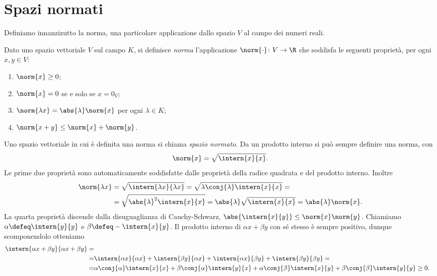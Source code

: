 \section{Spazi normati} \label{sec:spazi-normati}
Definiamo innanzizutto la norma, una particolare applicazione dallo spazio $V$ al campo dei numeri reali.
\begin{definizione} \label{d:norma}
	Dato uno spazio vettoriale $V$ sul campo $K$, si definisce \emph{norma} l'applicazione $\norm{\cdot}\colon V\to\R$ che soddisfa le seguenti proprietà, per ogni $  x,  y\in V$:
	\begin{enumerate}
		\item $\norm{  x}\geq 0$;
		\item $\norm{  x}=0$ se e solo se $  x=0_V$;
		\item $\norm{\lambda  x}=\abs{\lambda}\norm{  x}$ per ogni $\lambda\in K$;
		\item $\norm{  x+  y}\leq\norm{  x}+\norm{  y}$.
	\end{enumerate}
\end{definizione}
Uno spazio vettoriale in cui è definita una norma si chiama \emph{spazio normato}.
Da un prodotto interno si può sempre definire una norma, con
\begin{equation*}
	\norm{  x}=\sqrt{\intern{  x}{  x}}.
\end{equation*}
Le prime due proprietà sono automaticamente soddisfatte dalle proprietà della radice quadrata e del prodotto interno. Inoltre
\begin{equation*}
	\begin{split}
		\norm{\lambda  x}&=\sqrt{\intern{\lambda  x}{\lambda  x}}=\sqrt{\lambda\conj{\lambda}\intern{  x}{  x}}=\\
			 &=\sqrt{\abs{\lambda}^2\intern{  x}{  x}}=\abs{\lambda}\sqrt{\intern{  x}{  x}}=\abs{\lambda}\norm{  x}.
	\end{split}
\end{equation*}
La quarta proprietà discende dalla disuguaglianza di Cauchy-Schwarz, $\abs{\intern{  x}{  y}}\leq\norm{  x}\norm{  y}$.
Chiamiamo $\alpha\defeq\intern{  y}{  y}$ e $\beta\defeq-\intern{  x}{  y}$.
Il prodotto interno di $\alpha  x+\beta  y$ con sé stesso è sempre positivo, dunque scomponendolo otteniamo
\begin{equation*}
	\begin{split}
		\intern{\alpha  x+\beta  y}{\alpha  x+\beta  y}=\\
		=&\intern{\alpha  x}{\alpha  x}+\intern{\beta  y}{\alpha  x}+\intern{\alpha  x}{\beta  y}+\intern{\beta  y}{\beta  y}=\\
		=&\alpha\conj{\alpha}\intern{  x}{  x}+\beta\conj{\alpha}\intern{  y}{  x}+\alpha\conj{\beta}\intern{  x}{  y}+\beta\conj{\beta}\intern{  y}{  y}\geq 0.
	\end{split}
\end{equation*}
